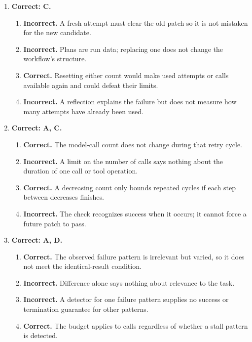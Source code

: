 \begin{enumerate}[start=21,itemsep=0.7\baselineskip]
\item[{\hyperref[exercise:27]{27.}}] \begin{minipage}[t]{\linewidth}
\textbf{Correct: C.}
\begin{enumerate}[label=\textnormal{(\Alph*)},leftmargin=*,itemsep=0pt]
\item \textbf{Incorrect.} A fresh attempt must clear the old patch so it is not mistaken for the new candidate.
\item \textbf{Incorrect.} Plans are run data; replacing one does not change the workflow's structure.
\item \textbf{Correct.} Resetting either count would make used attempts or calls available again and could defeat their limits.
\item \textbf{Incorrect.} A reflection explains the failure but does not measure how many attempts have already been used.
\end{enumerate}
\end{minipage}

\item[{\hyperref[exercise:28]{28.}}] \begin{minipage}[t]{\linewidth}
\textbf{Correct: A, C.}
\begin{enumerate}[label=\textnormal{(\Alph*)},leftmargin=*,itemsep=0pt]
\item \textbf{Correct.} The model-call count does not change during that retry cycle.
\item \textbf{Incorrect.} A limit on the number of calls says nothing about the duration of one call or tool operation.
\item \textbf{Correct.} A decreasing count only bounds repeated cycles if each step between decreases finishes.
\item \textbf{Incorrect.} The check recognizes success when it occurs; it cannot force a future patch to pass.
\end{enumerate}
\end{minipage}

\item[{\hyperref[exercise:29]{29.}}] \begin{minipage}[t]{\linewidth}
\textbf{Correct: A, D.}
\begin{enumerate}[label=\textnormal{(\Alph*)},leftmargin=*,itemsep=0pt]
\item \textbf{Correct.} The observed failure pattern is irrelevant but varied, so it does not meet the identical-result condition.
\item \textbf{Incorrect.} Difference alone says nothing about relevance to the task.
\item \textbf{Incorrect.} A detector for one failure pattern supplies no success or termination guarantee for other patterns.
\item \textbf{Correct.} The budget applies to calls regardless of whether a stall pattern is detected.
\end{enumerate}
\end{minipage}


\end{enumerate}
